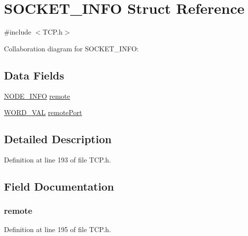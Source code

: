 \hypertarget{struct_s_o_c_k_e_t___i_n_f_o}{}\section{S\+O\+C\+K\+E\+T\+\_\+\+I\+N\+F\+O Struct Reference}
\label{struct_s_o_c_k_e_t___i_n_f_o}


{\ttfamily \#include $<$T\+C\+P.\+h$>$}



Collaboration diagram for S\+O\+C\+K\+E\+T\+\_\+\+I\+N\+F\+O\+:
\subsection*{Data Fields}
\begin{DoxyCompactItemize}
\item 
\hyperlink{_stack_tsk_8h_ac28a7d4076195ab8e3376f06055f8ee4}{N\+O\+D\+E\+\_\+\+I\+N\+F\+O} \hyperlink{struct_s_o_c_k_e_t___i_n_f_o_aa1e86fd8c2b12224dd8ccaeb34555171}{remote}
\item 
\hyperlink{union_w_o_r_d___v_a_l}{W\+O\+R\+D\+\_\+\+V\+A\+L} \hyperlink{struct_s_o_c_k_e_t___i_n_f_o_aa316e3d5bcdbc999280ce3bb80ef116e}{remote\+Port}
\end{DoxyCompactItemize}


\subsection{Detailed Description}


Definition at line 193 of file T\+C\+P.\+h.



\subsection{Field Documentation}
\hypertarget{struct_s_o_c_k_e_t___i_n_f_o_aa1e86fd8c2b12224dd8ccaeb34555171}{}
\subsubsection[{remote}]{ remote}\label{struct_s_o_c_k_e_t___i_n_f_o_aa1e86fd8c2b12224dd8ccaeb34555171}


Definition at line 195 of file T\+C\+P.\+h.

